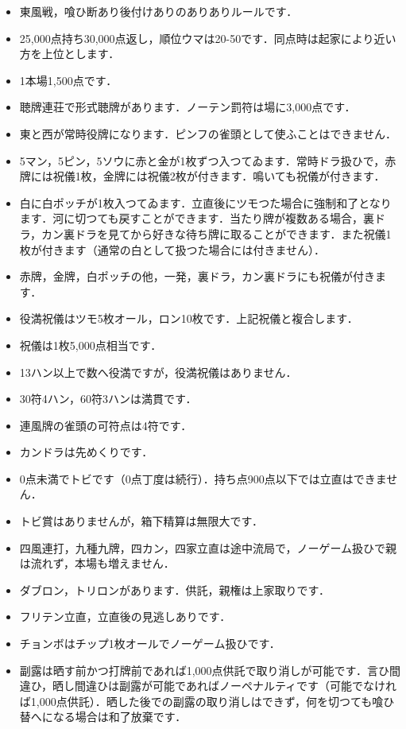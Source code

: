 \documentclass[uplatex]{jsarticle}
\theoremstyle{definition}
\begin{document}
\begin{itemize}
    \item 東風戦，喰ひ断あり後付けありのありありルールです．
    \item 25,000点持ち30,000点返し，順位ウマは20-50です．同点時は起家により近い方を上位とします．
    \item 1本場1,500点です．
    \item 聴牌連荘で形式聴牌があります．ノーテン罰符は場に3,000点です．
    \item 東と西が常時役牌になります．ピンフの雀頭として使ふことはできません．
    \item 5マン，5ピン，5ソウに赤と金が1枚ずつ入つてゐます．常時ドラ扱ひで，赤牌には祝儀1枚，金牌には祝儀2枚が付きます．鳴いても祝儀が付きます．
    \item 白に白ポッチが1枚入つてゐます．立直後にツモつた場合に強制和了となります．河に切つても戻すことができます．当たり牌が複数ある場合，裏ドラ，カン裏ドラを見てから好きな待ち牌に取ることができます．また祝儀1枚が付きます（通常の白として扱つた場合には付きません）．
    \item 赤牌，金牌，白ポッチの他，一発，裏ドラ，カン裏ドラにも祝儀が付きます．
    \item 役満祝儀はツモ5枚オール，ロン10枚です．上記祝儀と複合します．
    \item 祝儀は1枚5,000点相当です．
    \item 13ハン以上で数へ役満ですが，役満祝儀はありません．
    \item 30符4ハン，60符3ハンは満貫です．
    \item 連風牌の雀頭の可符点は4符です．
    \item カンドラは先めくりです．
    \item 0点未満でトビです（0点丁度は続行）．持ち点900点以下では立直はできません．
    \item トビ賞はありませんが，箱下精算は無限大です．
    \item 四風連打，九種九牌，四カン，四家立直は途中流局で，ノーゲーム扱ひで親は流れず，本場も増えません．
    \item ダブロン，トリロンがあります．供託，親権は上家取りです．
    \item フリテン立直，立直後の見逃しありです．
    \item チョンボはチップ1枚オールでノーゲーム扱ひです．
    \item 副露は晒す前かつ打牌前であれば1,000点供託で取り消しが可能です．言ひ間違ひ，晒し間違ひは副露が可能であればノーペナルティです（可能でなければ1,000点供託）．晒した後での副露の取り消しはできず，何を切つても喰ひ替へになる場合は和了放棄です．

\end{itemize}
\end{document}
